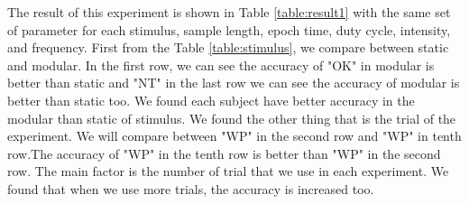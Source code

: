 \begin{table}[ht]
\centering
{}
\caption{Experiment result}
\label{table:result1}
\end{table}

The result of this experiment is shown in Table \ref{table:result1} with the same set of parameter for each stimulus, sample length, epoch time, duty cycle, intensity, and frequency. First from the Table \ref{table:stimulus}, we compare between static and modular. In the first row, we can see the accuracy of "OK" in modular is better than static and "NT" in the last row we can see the accuracy of modular is better than static too. We found each subject have better accuracy in the modular than static of stimulus. We found the other thing that is the trial of the experiment. We will compare between "WP" in the second row and "WP" in tenth row.The accuracy of "WP" in the tenth row is better than "WP" in the second row. The main factor is the number of trial that we use in each experiment. We found that when we use more trials, the accuracy is increased too.

